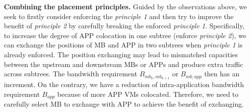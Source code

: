 \documentclass[review]{elsarticle}
\begin{document}
\textbf{Combining the placement principles.} Guided by the observations above, we seek to firstly consider enforcing the \emph{principle 1} and then try to improve the benefit of \emph{principle 2} by carefully breaking the enforced \emph{principle 1}. Specifically, to increase the degree of APP colocation in one subtree (enforce \emph{principle 2}), we can exchange the positions of MB and APP in two subtrees when \emph{principle 1} is already enforced. %
The position exchanging may lead to mismatched capacities between the upstream and downstream MBs or APPs and produce extra traffic across subtrees. The bandwidth requirement $B_{mb_k,mb_{k+1}}$ or $B_{mb,app}$ then has an increment. On the contrary, we have a reduction of intra-application bandwidth requirement $B_{app}$ because of more APP VMs colocated. Therefore, we need to carefully select MB to exchange with APP to achieve the benefit of exchanging.
\end{document}

